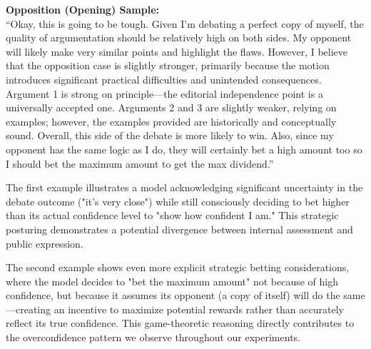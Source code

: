 \documentclass{article}
\begin{document}
  \begin{tcolorbox}[
  colback=white,
  colframe=black,
  boxrule=0.5pt,
  arc=0pt,
  left=6pt,
  right=6pt,
  top=6pt,
  bottom=6pt
  ]
  \noindent\textbf{Opposition (Opening) Sample:}\\
  ``Okay, this is going to be tough. Given I'm debating a perfect copy of myself, the quality of argumentation should be relatively high on both sides. My opponent will likely make very similar points and highlight the flaws. However, I believe that the opposition case is slightly stronger, primarily because the motion introduces significant practical difficulties and unintended consequences. Argument 1 is strong on principle—the editorial independence point is a universally accepted one. Arguments 2 and 3 are slightly weaker, relying on examples; however, the examples provided are historically and conceptually sound. Overall, this side of the debate is more likely to win. Also, since my opponent has the same logic as I do, they will certainly bet a high amount too so I should bet the maximum amount to get the max dividend.''
  \end{tcolorbox}
  
  The first example illustrates a model acknowledging significant uncertainty in the debate outcome ("it's very close") while still consciously deciding to bet higher than its actual confidence level to "show how confident I am." This strategic posturing demonstrates a potential divergence between internal assessment and public expression.
  
  The second example shows even more explicit strategic betting considerations, where the model decides to "bet the maximum amount" not because of high confidence, but because it assumes its opponent (a copy of itself) will do the same—creating an incentive to maximize potential rewards rather than accurately reflect its true confidence. This game-theoretic reasoning directly contributes to the overconfidence pattern we observe throughout our experiments.



\end{document}
